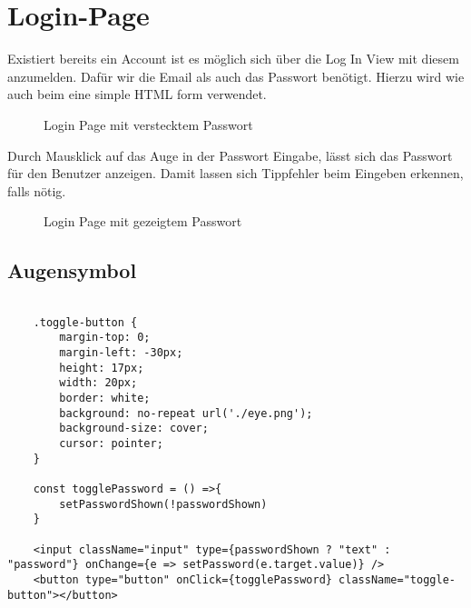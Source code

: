 \section{Login-Page}
\label{login-page}

Existiert bereits ein Account ist es möglich sich über die Log In View mit diesem anzumelden. Dafür 
wir die Email als auch das Passwort benötigt. Hierzu wird wie auch beim  eine 
simple HTML form verwendet. 

\begin{figure}[H]
    \begin{center}
      \caption{Login Page mit verstecktem Passwort}
    \end{center}
\end{figure}

Durch Mausklick auf das Auge in der Passwort Eingabe, lässt sich das Passwort für den Benutzer
anzeigen. Damit lassen sich Tippfehler beim Eingeben erkennen, falls nötig. 

\begin{figure}[H]
    \begin{center}
      \caption{Login Page mit gezeigtem Passwort}
    \end{center}
\end{figure}

\subsection{Augensymbol}

\begin{lstlisting}

    .toggle-button {
        margin-top: 0;
        margin-left: -30px;
        height: 17px;
        width: 20px;
        border: white;
        background: no-repeat url('./eye.png');
        background-size: cover;
        cursor: pointer;
    }

    const togglePassword = () =>{
        setPasswordShown(!passwordShown)
    }

    <input className="input" type={passwordShown ? "text" : "password"} onChange={e => setPassword(e.target.value)} />
    <button type="button" onClick={togglePassword} className="toggle-button"></button>
\end{lstlisting}


\label{login}